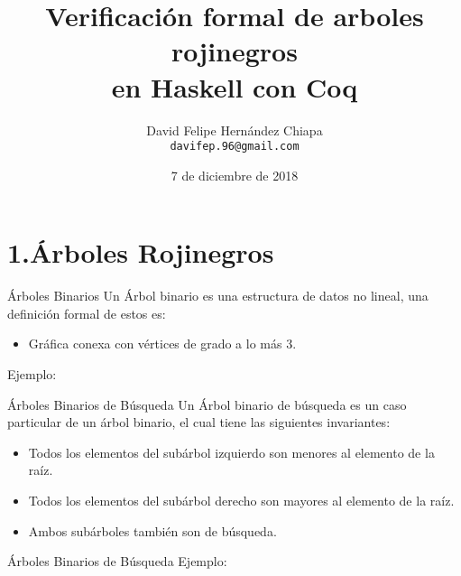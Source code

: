 \documentclass[xcolor=dvipsnames,table,handout]{beamer}
\title[]{Verificación formal de arboles rojinegros \\ en Haskell con Coq}
\author[David Hernández Chiapa]{David Felipe Hernández Chiapa \\
    \small{\texttt{davifep.96@gmail.com}}}
\institute[UNAM-FC]{Facultad de Ciencias \\
Universidad Nacional Aut\'onoma de M\'exico \\ \small{Proyecto
PAPIME PE102117}}
\date[]{\small{7 de diciembre de 2018}}
\begin{document}
\frame{\titlepage}

\section{1.Árboles Rojinegros}
\begin{frame}{Árboles Binarios}
Un Árbol binario es una estructura de datos no lineal, una definición formal de
estos es:
\begin{itemize}
    \item Gráfica conexa con vértices de grado a lo más 3.
\end{itemize}
Ejemplo:

\centering
\end{frame}

\begin{frame}{Árboles Binarios de Búsqueda}
Un Árbol binario de búsqueda es un caso particular de  un árbol binario, el
cual tiene las siguientes invariantes:
\begin{itemize}
    \item Todos los elementos del subárbol izquierdo son menores al elemento de
la raíz.
    \item Todos los elementos del subárbol derecho son mayores al elemento de la
raíz.
    \item Ambos subárboles también son de búsqueda.
\end{itemize}

\end{frame}


\begin{frame}{Árboles Binarios de Búsqueda}
Ejemplo:

\centering

\end{frame}
\end{document}

